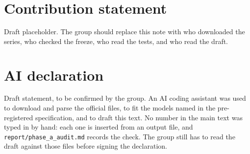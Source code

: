\documentclass[11pt,a4paper]{article}
\begin{document}
\section*{Contribution statement}
Draft placeholder. The group should replace this note with who downloaded the series, who checked the freeze, who read the tests, and who read the draft.

\section*{AI declaration}
Draft statement, to be confirmed by the group. An AI coding assistant was used to download and parse the official files, to fit the models named in the pre-registered specification, and to draft this text. No number in the main text was typed in by hand: each one is inserted from an output file, and \texttt{report/phase\_a\_audit.md} records the check. The group still has to read the draft against those files before signing the declaration.
\end{document}
